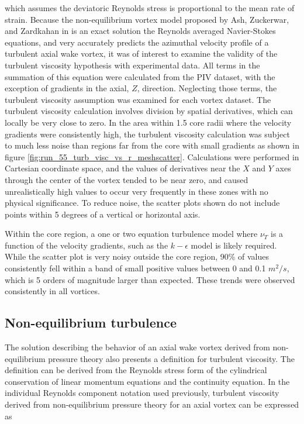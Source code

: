 \noindent
which assumes the deviatoric Reynolds stress is proportional to the mean rate 
of strain. Because the non-equilibrium vortex model proposed by Ash, Zuckerwar, 
and Zardkahan in \cite{ash2011} is an exact solution the Reynolds averaged 
Navier-Stokes equations, and very accurately predicts the azimuthal velocity 
profile of a turbulent axial wake vortex, it was of interest to examine the 
validity of 
the turbulent viscosity hypothesis with experimental data. All terms in the 
summation of this equation were calculated from the PIV dataset, with the 
exception of gradients in the axial, $Z$, direction. Neglecting those terms, 
the turbulent viscosity assumption was examined for each vortex dataset. The 
turbulent viscosity calculation involves division by spatial derivatives, which 
can locally be very close to zero. In the area within 1.5 core radii where the 
velocity gradients were consistently high, the turbulent viscosity calculation 
was subject to much less noise than regions far from the core with small 
gradients as shown in figure \ref{fig:run_55_turb_visc_vs_r_meshscatter}. 
Calculations were performed in Cartesian coordinate space, and the values 
of derivatives near the $X$ and $Y$ axes through the center of the vortex 
tended to be near zero, and caused unrealistically high values to occur very 
frequently in these zones with no physical significance. To reduce noise, the 
scatter plots shown do not include points within 5 degrees of a vertical or 
horizontal axis.



\noindent
Within the core region, a one or two equation turbulence model where $\nu_T$ is 
a function of the velocity gradients, such as the $k-\epsilon$ model is likely 
required. While the scatter plot is very noisy outside the core region, 
90\% of values consistently fell within a band of small positive values between 
0 and 0.1 $m^2/s$, which is 5 orders of magnitude larger than expected.
These trends were observed consistently in all vortices.

\subsection{Non-equilibrium turbulence}
The solution describing the behavior of an axial wake vortex derived from 
non-equilibrium pressure theory also presents a definition for turbulent 
viscosity. The definition can be derived from the Reynolds stress form of the 
cylindrical conservation of linear momentum equations and the continuity 
equation. In the individual Reynolds component notation used previously, 
turbulent viscosity derived from non-equilibrium pressure theory for an axial 
vortex can be expressed as

